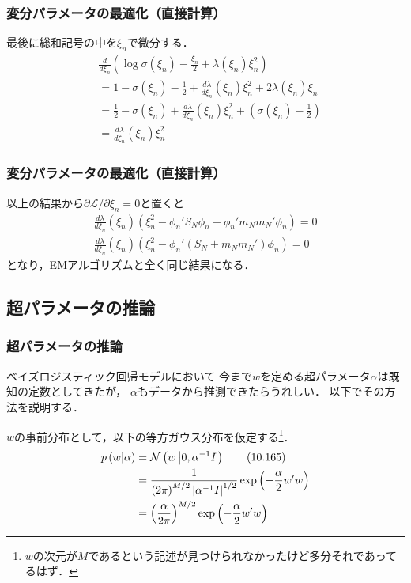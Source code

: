\documentclass[10pt,usepdftitle=false,hyperref={unicode}]{beamer}
\newcommand{\absolute}[1]{\left|#1\right|}
\newcommand{\parentheses}[1]{\left(#1\right)}
\newcommand{\energy}{\mathcal{L}}
\begin{document}
\begin{frame}
\frametitle{変分パラメータの最適化（直接計算）}
最後に総和記号の中を$\xi_n$で微分する．
\begin{align*}
    &\frac{d}{d\xi_n}
        \parentheses{%
            \log\sigma\parentheses{\xi_n}
            - \frac{\xi_n}{2}
            + \lambda\parentheses{\xi_n}\xi_n^2
        } \\
    &= 1 - \sigma\parentheses{\xi_n} - \frac{1}{2} + \frac{d\lambda}{d\xi_n}\parentheses{\xi_n}\xi_n^2 + 2\lambda\parentheses{\xi_n}\xi_n \\
    &= \frac{1}{2} - \sigma\parentheses{\xi_n} + \frac{d\lambda}{d\xi_n}
            \parentheses{\xi_n}\xi_n^2 + \parentheses{\sigma\parentheses{\xi_n} - \frac{1}{2}} \\
    &= \frac{d\lambda}{d\xi_n}\parentheses{\xi_n}\xi_n^2
\end{align*}
\end{frame}

\begin{frame}
\frametitle{変分パラメータの最適化（直接計算）}
以上の結果から$\partial \energy/\partial \xi_n = 0$と置くと
\begin{gather*}
    \frac{d\lambda}{d\xi_n}
    \parentheses{\xi_n}
    \parentheses{%
        \xi_n^2
        - \phi_n'S_N \phi_n
        - \phi_n'm_Nm_N'\phi_n
    }
    = 0 \\
    \frac{d\lambda}{d\xi_n}
    \parentheses{\xi_n}
    \parentheses{%
        \xi_n^2
        - \phi_n'
        \parentheses{S_N + m_Nm_N'}\phi_n
    }
    = 0
\end{gather*}
となり，EMアルゴリズムと全く同じ結果になる．
\end{frame}

\subsection{超パラメータの推論}
\begin{frame}
\frametitle{超パラメータの推論}
ベイズロジスティック回帰モデルにおいて
今まで$w$を定める超パラメータ$\alpha$は既知の定数としてきたが，
$\alpha$もデータから推測できたらうれしい．
以下でその方法を説明する．

\bigskip

$w$の事前分布として，以下の等方ガウス分布を仮定する\footnote[frame]{$w$の次元が$M$であるという記述が見つけられなかったけど多分それであってるはず．}．
\begin{align}
    p\parentheses{w|\alpha}
    &= \mathcal{N}\parentheses{w\left|0,\alpha^{-1}I\right.} \tag{10.165} \label{pwa} \\
    &= \frac{1}{\parentheses{2\pi}^{M/2}\absolute{\alpha^{-1}I}^{1/2}} \exp\parentheses{-\frac{\alpha}{2}w'w} \notag \\
    &= \parentheses{\frac{\alpha}{2\pi}}^{M/2} \exp\parentheses{-\frac{\alpha}{2}w'w} \notag
\end{align}
\end{frame}
\end{document}
